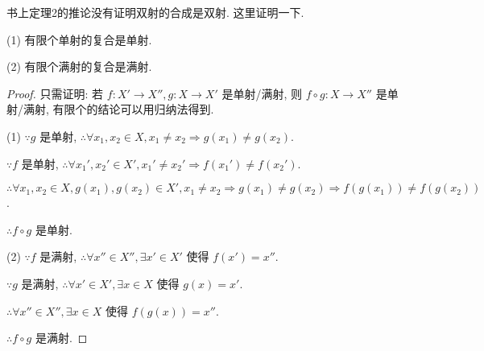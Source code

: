 \documentclass{ctexart}
\begin{document}
书上定理2的推论没有证明双射的合成是双射. 这里证明一下.
\begin{theorem}
    (1) 有限个单射的复合是单射.
    
    (2) 有限个满射的复合是满射.
\end{theorem}
\begin{proof}
    只需证明: 若 $f:X'\to X'',g:X\to X'$ 是单射/满射, 则 $f\circ g:X\to X''$ 是单射/满射, 有限个的结论可以用归纳法得到.

    (1) $\because g$ 是单射, $\therefore\forall x_1,x_2\in X,x_1\neq x_2\Rightarrow g(x_1)\neq g(x_2)$.
    
    $\because f$ 是单射, $\therefore\forall x_1',x_2'\in X',x_1'\neq x_2'\Rightarrow f(x_1')\neq f(x_2')$.

    $\therefore\forall x_1,x_2\in X,g(x_1),g(x_2)\in X',x_1\neq x_2\Rightarrow g(x_1)\neq g(x_2)\Rightarrow f(g(x_1))\neq f(g(x_2))$.

    $\therefore f\circ g$ 是单射.

    (2) $\because f$ 是满射, $\therefore\forall x''\in X'',\exists x'\in X'$ 使得 $f(x')=x''$.

    $\because g$ 是满射, $\therefore\forall x'\in X',\exists x\in X$ 使得 $g(x)=x'$.

    $\therefore\forall x''\in X'',\exists x\in X$ 使得 $f(g(x))=x''$.

    $\therefore f\circ g$ 是满射.
\end{proof}
\end{document}
